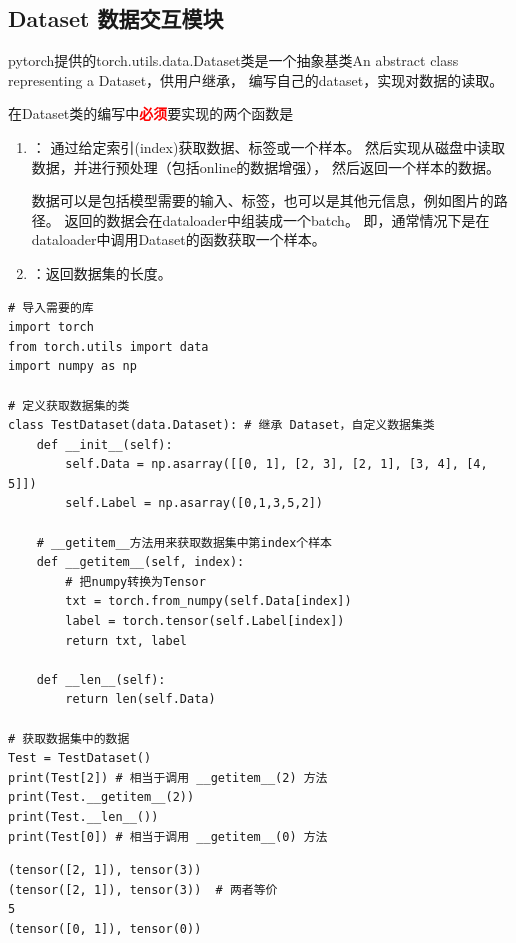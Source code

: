 \subsection{Dataset 数据交互模块}
\label{subsec:pytorch_Dataset}
pytorch提供的torch.utils.data.Dataset类是一个抽象基类An abstract class representing a Dataset，供用户继承，
编写自己的dataset，实现对数据的读取。

在Dataset类的编写中\textcolor{red}{\textbf{必须}}要实现的两个函数是
\begin{enumerate}[label=\arabic*)]
    \item {}：
    通过给定索引(index)获取数据、标签或一个样本。
    然后实现从磁盘中读取数据，并进行预处理（包括online的数据增强），
    然后返回一个样本的数据。
    
    数据可以是包括模型需要的输入、标签，也可以是其他元信息，例如图片的路径。
    返回的数据会在dataloader中组装成一个batch。
    即，通常情况下是在dataloader中调用Dataset的函数获取一个样本。

    \item {}：返回数据集的长度。
\end{enumerate}


\begin{lstlisting}[style=pythonstyle]
# 导入需要的库
import torch
from torch.utils import data
import numpy as np

# 定义获取数据集的类
class TestDataset(data.Dataset): # 继承 Dataset，自定义数据集类
    def __init__(self):
        self.Data = np.asarray([[0, 1], [2, 3], [2, 1], [3, 4], [4, 5]])
        self.Label = np.asarray([0,1,3,5,2])

    # __getitem__方法用来获取数据集中第index个样本
    def __getitem__(self, index):
        # 把numpy转换为Tensor
        txt = torch.from_numpy(self.Data[index])
        label = torch.tensor(self.Label[index])
        return txt, label

    def __len__(self):
        return len(self.Data)

# 获取数据集中的数据
Test = TestDataset()
print(Test[2]) # 相当于调用 __getitem__(2) 方法
print(Test.__getitem__(2))
print(Test.__len__()) 
print(Test[0]) # 相当于调用 __getitem__(0) 方法
\end{lstlisting}
\begin{lstlisting}[style=demostyle,numbers=none] 
(tensor([2, 1]), tensor(3))
(tensor([2, 1]), tensor(3))  # 两者等价
5
(tensor([0, 1]), tensor(0))
\end{lstlisting}    

